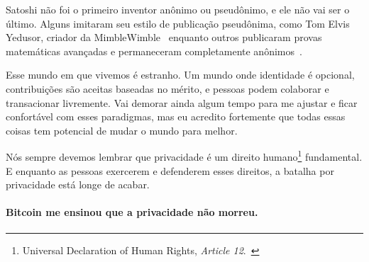 Satoshi não foi o primeiro inventor anônimo ou pseudônimo, e ele não vai ser o último.
Alguns imitaram seu estilo de publicação pseudônima, como Tom Elvis Yedusor, criador da 
MimbleWimble~\cite{mimblewimble-origin} enquanto outros publicaram provas matemáticas avançadas 
e permaneceram completamente anônimos~\cite{4chan-math}.

Esse mundo em que vivemos é estranho. Um mundo onde identidade é opcional, 
contribuições são aceitas baseadas no mérito, e pessoas podem colaborar e transacionar livremente.
Vai demorar ainda algum tempo para me ajustar e ficar confortável com esses paradigmas, mas eu acredito 
fortemente que todas essas coisas tem potencial de mudar o mundo para melhor.

Nós sempre devemos lembrar que privacidade é um direito humano\footnote{Universal 
	Declaration of Human Rights, \textit{Article 12}.~\cite{article12}} fundamental. 
E enquanto as pessoas exercerem e defenderem 
esses direitos, a batalha por privacidade está longe de acabar.

\paragraph{Bitcoin me ensinou que a privacidade não morreu.}

%
%
%
%
